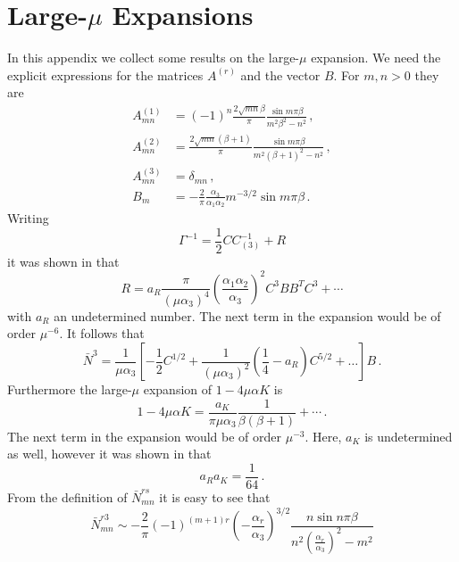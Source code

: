 \documentclass[12pt]{article}
\def\G{\Gamma}
\def\a{\alpha}
\def\b{\beta}
\def\d{\delta}
\def\m{\mu}
\numberwithin{equation}{section} \setlength{\textwidth}{17cm}
\begin{document}
\section{Large-$\m$ Expansions}\label{appE}
\setcounter{section}{5}
\renewcommand{\thesection}{\Alph{section}}
\setcounter{equation}{0}
In this appendix we collect some results on the large-$\m$ expansion.
We need the explicit expressions for the matrices $A^{(r)}$ and the vector $B$.
For $m,n>0$ they are
\begin{equation}
\begin{split}
A^{(1)}_{mn} & = (-1)^n\frac{2\sqrt{mn}\b}{\pi}\frac{\sin m\pi\b}{m^2\b^2-n^2}\,,\\
A^{(2)}_{mn} & = \frac{2\sqrt{mn}(\b+1)}{\pi}\frac{\sin m\pi\b}{m^2(\b+1)^2-n^2}\,,\\
A^{(3)}_{mn} & = \d_{mn}\,,\\
B_m & =-\frac{2}{\pi}\frac{\a_3}{\a_1\a_2}m^{-3/2}\sin m\pi\b\,.
\end{split}
\end{equation}
Writing
\begin{equation}
\G^{-1}=\frac{1}{2}CC_{(3)}^{-1}+R
\end{equation}
it was shown in \cite{sch} that
\begin{equation}
R = a_R\frac{\pi}{(\m\a_3)^4}\left(\frac{\a_1\a_2}{\a_3}\right)^2C^3BB^TC^3+\cdots
\end{equation}
with $a_R$ an undetermined number. The next term in the expansion would be of order $\m^{-6}$.
It follows that
\begin{equation}
\bar{N}^3 = \frac{1}{\m\a_3}\left[-\frac{1}{2}C^{1/2}+
\frac{1}{(\m\a_3)^2}\left(\frac{1}{4}-a_R\right)C^{5/2}+\ldots\right]B\,.
\end{equation}
Furthermore the large-$\m$ expansion of $1-4\m\a K$ is~\cite{sch}
\begin{equation}
1-4\m\a K = \frac{a_K}{\pi\m\a_3}\frac{1}{\b(\b+1)}+\cdots\,.
\end{equation}
The next term in the expansion would be of order $\m^{-3}$. Here, $a_K$ is undetermined as
well, however it was shown in \cite{sch} that
\begin{equation}
a_Ra_K=\frac{1}{64}\,.
\end{equation}
From the definition of $\bar{N}^{rs}_{mn}$ it is easy to see that
\begin{equation}
\bar{N}^{r3}_{mn} \sim -\frac{2}{\pi}(-1)^{(m+1)r}\left(-\frac{\a_r}{\a_3}
\right)^{3/2}
\frac{n\sin 
n\pi\b}{n^2\left(\displaystyle{\frac{\a_r}{\a_3}}\right)^2-m^2}
\end{equation}
\end{document}
